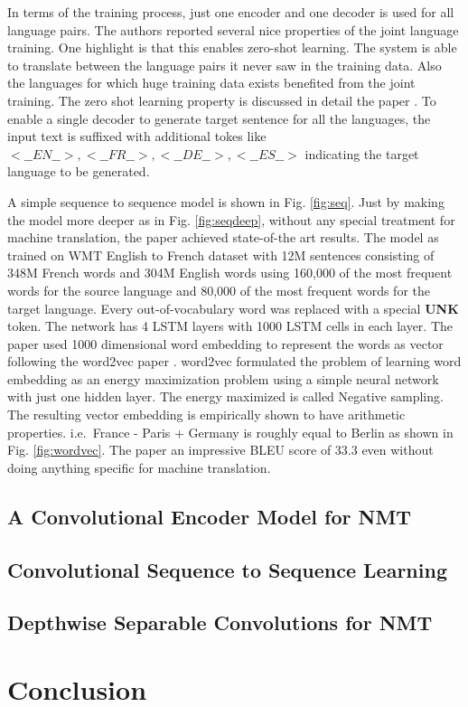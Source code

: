 \documentclass[a4paper]{article}
\begin{document}
In terms of the training process, just one encoder  and one decoder  is used for
all  language  pairs. The authors  reported several nice properties of the joint
language training. One highlight  is that  this enables zero-shot learning.  The
system is able  to translate between the  language  pairs it never  saw  in  the
training data. Also the languages for which huge  training data exists benefited
from the joint training. The zero shot learning property  is discussed in detail
the  paper  \cite{johnson2016google}.  To  enable  a single decoder to  generate
target  sentence for  all  the  languages,  the  input  text  is  suffixed  with
additional  tokes  like $<\_\_EN\_\_>, <\_\_FR\_\_>, <\_\_DE\_\_>, <\_\_ES\_\_>$
indicating the target language to be generated.

A simple sequence  to sequence  model is shown in  Fig. \ref{fig:seq}.  Just  by
making the model  more deeper as in Fig. \ref{fig:seqdeep}, without any  special
treatment for machine translation, the paper achieved state-of-the art  results.
The  model as trained  on  WMT  English  to  French dataset with  12M  sentences
consisting of 348M French words and 304M English words using 160,000 of the most
frequent words for the source language and 80,000 of the most frequent words for
the target language. Every  out-of-vocabulary word was replaced with  a  special
\textbf{UNK} token.  The network has 4  LSTM layers with 1000 LSTM cells in each
layer. The paper used 1000 dimensional  word embedding to represent the words as
vector  following  the word2vec  paper  \cite{mikolov2013distributed}.  word2vec
formulated  the  problem  of learning word embedding as an  energy  maximization
problem  using a  simple neural network with just  one  hidden layer. The energy
maximized  is  called  Negative  sampling.  The resulting  vector  embedding  is
empirically shown to  have  arithmetic properties.  i.e. $\,$France  -  Paris  +
Germany is roughly equal to Berlin as shown in Fig. \ref{fig:wordvec}. The paper
an impressive  BLEU  score  of  33.3 even without  doing  anything  specific for
machine translation.


\subsection{A Convolutional Encoder Model for NMT}


\subsection{Convolutional Sequence to Sequence Learning}


\subsection{Depthwise Separable Convolutions for NMT}


\section{Conclusion}




\end{document}
